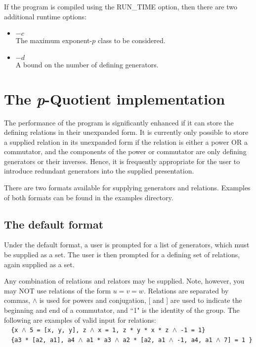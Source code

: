If the program is compiled using the RUN\_TIME option, then
there are two additional runtime options:

\begin{itemize}

\item $-c$  \\
The maximum exponent-$p$ class to be considered.

\item $-d$ \\
A bound on the number of defining generators.

\end{itemize}

\section{The {\it p}-Quotient implementation}

The performance of the program is significantly enhanced if 
it can store the defining relations in their unexpanded form.
It is currently only possible to store a supplied relation in its
unexpanded form if the relation is either a power OR a commutator, 
and the components of the power or commutator are only
defining generators or their inverses. Hence, it is frequently 
appropriate for the user to introduce redundant generators into 
the supplied presentation. 

There are two formats available for supplying
generators and relations.  Examples of both formats 
can be found in the examples directory.

\subsection{The default format}
Under the default format, a user is prompted for a list of 
generators, which must be supplied as a set.
The user is then prompted for a defining set of relations,
again supplied as a set.

Any combination of relations and relators may be supplied. 
Note, however, you may NOT use relations of the form $u = v = w$.
Relations are separated by commas, $\wedge$ is used for powers and 
conjugation, [ and ] are used to indicate the beginning and end 
of a commutator, and ``1" is the identity of the group.  
The following are examples of valid input for relations: \\
\mbox{
\tt
\{x $\wedge$ 5 = [x, y, y], z $\wedge$ x = 1, z * y * x * z $\wedge$ -1 = 1\}
}
\\
\mbox{
\tt
\{a3 * [a2, a1], a4 $\wedge$ a1 * a3 $\wedge$ a2 * [a2, a1 $\wedge$ -1, a4, a1 $\wedge$ 7] = 1 \}
}

